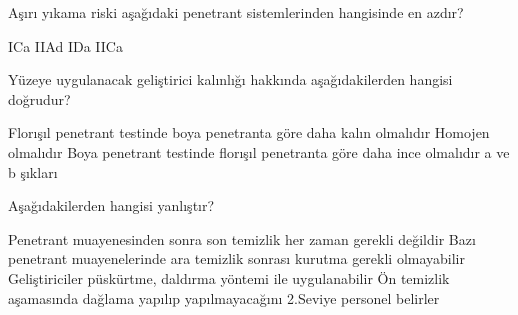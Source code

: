 \begin{question}[subtitle=]
  Aşırı yıkama riski aşağıdaki penetrant sistemlerinden hangisinde en azdır?
  \begin{tasks}
    \task ICa 
    \task IIAd 
    \task IDa \correct
    \task IICa 
  \end{tasks}
\end{question}
\begin{solution}
	\correct
\end{solution}

\begin{question}[subtitle=]
 Yüzeye uygulanacak geliştirici kalınlığı hakkında aşağıdakilerden hangisi doğrudur? 
  \begin{tasks}
    \task Florışıl penetrant testinde boya penetranta göre daha kalın olmalıdır
    \task Homojen olmalıdır \correct
    \task Boya penetrant testinde florışıl penetranta göre daha ince olmalıdır
    \task a ve b şıkları
  \end{tasks}
\end{question}
\begin{solution}
	\correct
\end{solution}

\begin{question}[subtitle=]
  Aşağıdakilerden hangisi yanlıştır?
  \begin{tasks}
    \task Penetrant muayenesinden sonra son temizlik her zaman gerekli değildir \correct
    \task Bazı penetrant muayenelerinde ara temizlik sonrası kurutma gerekli olmayabilir
    \task Geliştiriciler püskürtme, daldırma yöntemi ile uygulanabilir
    \task Ön temizlik aşamasında dağlama yapılıp yapılmayacağını 2.Seviye personel belirler
  \end{tasks}
\end{question}
\begin{solution}
	\correct
\end{solution}
